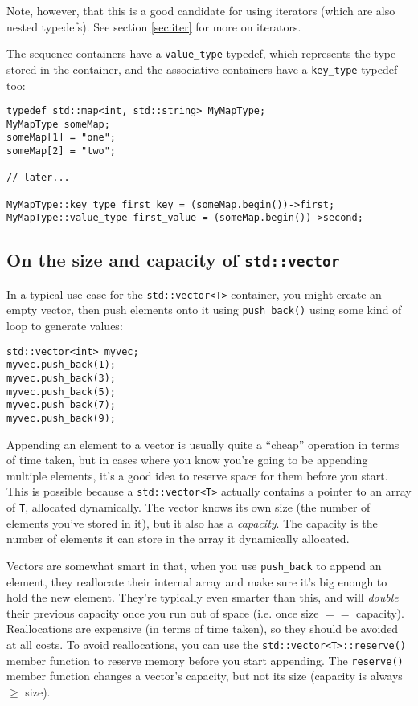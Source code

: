\documentclass[a4paper]{scrartcl}
\begin{document}
Note, however, that this is a good candidate for using iterators (which are also nested typedefs). See section \ref{sec:iter} for more on iterators.

The sequence containers have a \verb|value_type| typedef, which represents the type stored in the container, and the associative containers have a \verb|key_type| typedef too:

\begin{verbatim}
typedef std::map<int, std::string> MyMapType;
MyMapType someMap;
someMap[1] = "one";
someMap[2] = "two";

// later...

MyMapType::key_type first_key = (someMap.begin())->first;
MyMapType::value_type first_value = (someMap.begin())->second;
\end{verbatim}

\subsection{On the size and capacity of \texttt{std::vector}}
In a typical use case for the \verb|std::vector<T>| container, you might create an empty vector, then push elements onto it using \verb|push_back()| using some kind of loop to generate values:

\begin{verbatim}
std::vector<int> myvec;
myvec.push_back(1);
myvec.push_back(3);
myvec.push_back(5);
myvec.push_back(7);
myvec.push_back(9);
\end{verbatim}

Appending an element to a vector is usually quite a ``cheap'' operation in terms of time taken, but in cases where you know you're going to be appending multiple elements, it's a good idea to reserve space for them before you start. This is possible because a \verb|std::vector<T>| actually contains a pointer to an array of \verb|T|, allocated dynamically. The vector knows its own size (the number of elements you've stored in it), but it also has a \emph{capacity}. The capacity is the number of elements it can store in the array it dynamically allocated.

Vectors are somewhat smart in that, when you use \verb|push_back| to append an element, they reallocate their internal array and make sure it's big enough to hold the new element. They're typically even smarter than this, and will \emph{double} their previous capacity once you run out of space (i.e. once size $==$ capacity). Reallocations are expensive (in terms of time taken), so they should be avoided at all costs. To avoid reallocations, you can use the \verb|std::vector<T>::reserve()| member function to reserve memory before you start appending. The \verb|reserve()| member function changes a vector's capacity, but not its size (capacity is always $\ge$ size).
\end{document}
